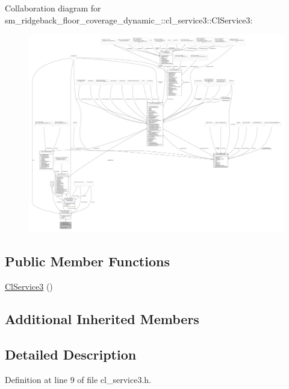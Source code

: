Collaboration diagram for sm\+\_\+ridgeback\+\_\+floor\+\_\+coverage\+\_\+dynamic\+\_\+:\+:cl\+\_\+service3\+:\+:Cl\+Service3\+:
\nopagebreak
\begin{figure}[H]
\begin{center}
\leavevmode
\includegraphics[width=350pt]{classsm__ridgeback__floor__coverage__dynamic__1_1_1cl__service3_1_1ClService3__coll__graph}
\end{center}
\end{figure}
\subsection*{Public Member Functions}
\begin{DoxyCompactItemize}
\item 
\hyperlink{classsm__ridgeback__floor__coverage__dynamic__1_1_1cl__service3_1_1ClService3_ad1bdb8b4990a86c3dd1a55353c56cc2d}{Cl\+Service3} ()
\end{DoxyCompactItemize}
\subsection*{Additional Inherited Members}


\subsection{Detailed Description}


Definition at line 9 of file cl\+\_\+service3.\+h.




